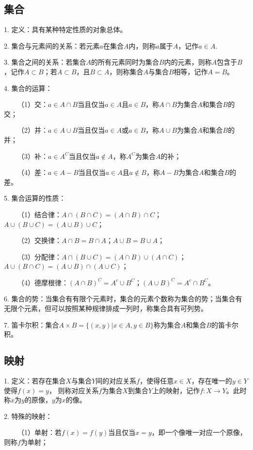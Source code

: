 \subsection{集合}

1. 定义：具有某种特定性质的对象总体。

2. 集合与元素间的关系：若元素$a$在集合$A$内，则称$a$属于$A$，记作$a \in A$.

3. 集合之间的关系：若集合$A$的所有元素同时为集合$B$内的元素，则称$A$包含于$B$，记作$A \subset B$；若$A \subset B$，且$B \subset A$，则称集合$A$与集合$B$相等，记作$A=B$。

4. 集合的运算：

~~~~（1）交：$a \in A \cap B$当且仅当$a \in A$且$a \in B$，称$A \cap B$为集合$A$和集合$B$的交；

~~~~（2）并：$a \in A \cup B$当且仅当$a \in A$或$a \in B$，称$A \cup B$为集合$A$和集合$B$的并；

~~~~（3）补：$a \in A^C$当且仅当$a \notin A$，称$A^C$为集合$A$的补；

~~~~（4）差：$a \in A-B$当且仅当$a \in A$且$a \notin B$，称$A-B$为集合$A$和集合$B$的差。

5. 集合运算的性质：

~~~~（1）结合律：$A \cap(B\cap C)=(A \cap B)\cap C$；$A \cup(B\cup C)=(A \cup B)\cup C$；

~~~~（2）交换律：$A\cap B = B \cap A$；$A \cup B = B \cup A$；

~~~~（3）分配律：$A \cap (B \cup C)=(A \cap B)\cup(A\cap C)$；
$A \cup (B \cap C)=(A \cup B)\cap(A\cup C)$；

~~~~（4）德摩根律：$(A\cap B)^C=A^c\cup B^C$；$(A\cup B)^C=A^c\cap B^C$。

6. 集合的势：当集合有有限个元素时，集合的元素个数称为集合的势；当集合有无限个元素，但可以按照某种规律排成一列时，称集合具有可列势。

7. 笛卡尔积：集合$A\times B =\{(x,y)|x \in A,y \in B\}$称为集合$A$和集合$B$的笛卡尔积。

\subsection{映射}

1. 定义：若存在集合$X$与集合$Y$间的对应关系$f$，使得任意$x \in X$，存在唯一的$y \in Y$使得$f(x)=y$，
则称对应关系$f$为集合$X$到集合$Y$上的映射，记作$f:X\rightarrow Y$。此时称$x$为$y$的原像，$y$为$x$的像。

2. 特殊的映射：

~~~~（1）单射：若$f(x)=f(y)$当且仅当$x=y$，即一个像唯一对应一个原像，则称$f$为单射；

